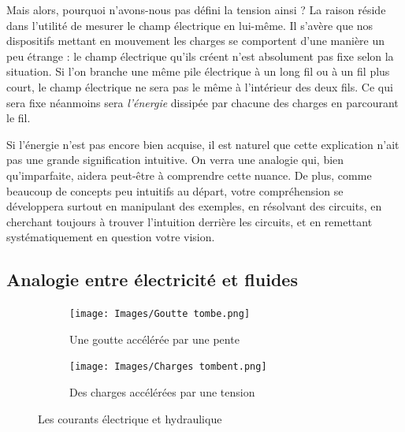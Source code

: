 \documentclass{article}
\begin{document}
Mais alors, pourquoi n'avons-nous pas défini la tension ainsi ? La raison réside dans l'utilité de mesurer le champ électrique en lui-même. Il s'avère que nos dispositifs mettant en mouvement les charges se comportent d'une manière un peu étrange : le champ électrique qu'ils créent n'est absolument pas fixe selon la situation. Si l'on branche une même pile électrique à un long fil ou à un fil plus court, le champ électrique ne sera pas le même à l'intérieur des deux fils. Ce qui sera fixe néanmoins sera \emph{l'énergie} dissipée par chacune des charges en parcourant le fil.

Si l'énergie n'est pas encore bien acquise, il est naturel que cette explication n'ait pas une grande signification intuitive. On verra une analogie qui, bien qu'imparfaite, aidera peut-être à comprendre cette nuance. De plus, comme beaucoup de concepts peu intuitifs au départ, votre compréhension se développera surtout en manipulant des exemples, en résolvant des circuits, en cherchant toujours à trouver l'intuition derrière les circuits, et en remettant systématiquement en question votre vision. 

\subsection{Analogie entre électricité et fluides}
\label{ssec:analogie_hydrau}

\begin{figure}[h]
    \centering
    \begin{subfigure}{0.4\textwidth}
        \centering
        \texttt{[image: Images/Goutte tombe.png]}
        \caption{Une goutte accélérée par une pente}
    \end{subfigure}
    \hspace{0.1\textwidth}
    \begin{subfigure}{0.4\textwidth}
        \centering
        \texttt{[image: Images/Charges tombent.png]}
        \caption{Des charges accélérées par une tension}
    \end{subfigure}
    \caption{Les courants électrique et hydraulique}
    \label{fig:hydro-vs-électro}
\end{figure}
\end{document}
